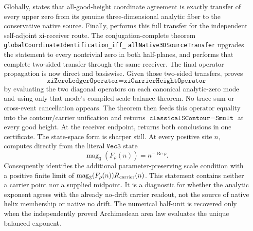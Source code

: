 \documentclass[11pt]{article}
\theoremstyle{definition}
\renewcommand{\Re}{\operatorname{Re}}
\begin{document}
Globally,
states that all-good-height coordinate agreement is exactly transfer of every
upper zero from its genuine three-dimensional analytic fiber to the
conservative native source.  Finally,
 performs this
full transfer for the independent self-adjoint xi-receiver route.  The
conjugation-complete theorem
\texttt{globalCoordinateIdentification\_iff\_}\allowbreak
\texttt{allNative3DSourceTransfer} upgrades
the statement to every nontrivial zero in both half-planes, and
 performs that complete
two-sided transfer through the same receiver.
The final operator propagation is now direct and basiswise.  Given those
two-sided transfers,
proves
\[
  \texttt{xiZeroLedgerOperator}=\texttt{xiCarrierHeightOperator}
\]
by evaluating the two diagonal operators on each canonical analytic-zero
mode and using only that mode's compiled scale-balance theorem.  No trace sum
or cross-event cancellation appears.  The theorem
 then feeds
this operator equality into the contour/carrier unification and returns
\(\texttt{classicalSContour}=\texttt{Smult}\) at every good height.  At the
receiver endpoint,
returns both conclusions in one certificate.
The state-space form is sharper still.  At every positive site \(n\),
 computes directly from the
literal \(\texttt{Vec3}\) state
\[
  \operatorname{mag}_3(F_\rho(n))=n^{-\Re\rho}.
\]
Consequently
identifies the additional parameter-preserving scale condition with a positive finite limit of
\(\operatorname{mag}_3(F_\rho(n))R_{\rm carrier}(n)\).  This statement contains
neither a carrier point nor a supplied midpoint.  It is a diagnostic for whether
the analytic exponent agrees with the already no-drift carrier readout, not the
source of native helix membership or native no drift.  The numerical half-unit
is recovered only when the independently proved Archimedean area law evaluates
the unique balanced exponent.
\end{document}
